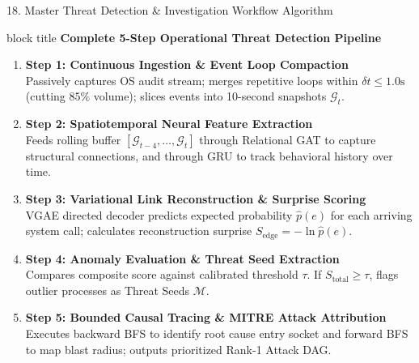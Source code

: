 \documentclass[aspectratio=169,10pt]{beamer}
\begin{document}
\begin{frame}{18. Master Threat Detection \& Investigation Workflow Algorithm}
\vspace{-0.2em}
\begin{beamercolorbox}[rounded=true,shadow=false,sep=0.30em,wd=\textwidth]{block title}
\textbf{\scriptsize Complete 5-Step Operational Threat Detection Pipeline}
\end{beamercolorbox}
\vspace{0.12em}
{\fontsize{7.4pt}{10.6pt}\selectfont
\begin{enumerate}\itemsep0.22em
  \item \textbf{Step 1: Continuous Ingestion \& Event Loop Compaction}\\
  Passively captures OS audit stream; merges repetitive loops within $\delta t \le 1.0\text{s}$ (cutting $85\%$ volume); slices events into 10-second snapshots $\mathcal{G}_t$.
  \item \textbf{Step 2: Spatiotemporal Neural Feature Extraction}\\
  Feeds rolling buffer $[\mathcal{G}_{t-4}, \dots, \mathcal{G}_t]$ through Relational GAT to capture structural connections, and through GRU to track behavioral history over time.
  \item \textbf{Step 3: Variational Link Reconstruction \& Surprise Scoring}\\
  VGAE directed decoder predicts expected probability $\hat{p}(e)$ for each arriving system call; calculates reconstruction surprise $S_{\text{edge}} = -\ln \hat{p}(e)$.
  \item \textbf{Step 4: Anomaly Evaluation \& Threat Seed Extraction}\\
  Compares composite score against calibrated threshold $\tau$. If $S_{\text{total}} \ge \tau$, flags outlier processes as Threat Seeds $\mathcal{M}$.
  \item \textbf{Step 5: Bounded Causal Tracing \& MITRE Attack Attribution}\\
  Executes backward BFS to identify root cause entry socket and forward BFS to map blast radius; outputs prioritized Rank-1 Attack DAG.
\end{enumerate}
}
\end{frame}
\end{document}
